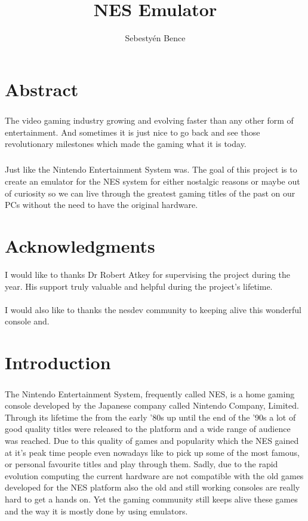 \documentclass[]{report}
\title{NES Emulator}
\author{Sebestyén Bence}
\begin{document}
	
\chapter*{Abstract}
\paragraph{ }
The video gaming industry growing and evolving faster than any other form of entertainment. And sometimes it is just nice to go back and see those revolutionary milestones which made the gaming what it is today. 
\paragraph{ }
Just like the Nintendo Entertainment System was. The goal of this project is to create an emulator for the NES system for either nostalgic reasons or maybe out of curiosity so we can live through the greatest gaming titles of the past on our PCs without the need to have the original hardware.

\pagebreak

\chapter*{Acknowledgments}
I would like to thanks Dr Robert Atkey for supervising the project during the year. His support truly valuable and helpful during the project's lifetime.
\\
\\
I would also like to thanks the nesdev community to keeping alive this wonderful console and.
\pagebreak


\tableofcontents

\clearpage

\chapter{Introduction}

\paragraph{}
The Nintendo Entertainment System, frequently called NES, is a home gaming console developed by the Japanese company called Nintendo Company, Limited.  Through its lifetime the from the early '80s up until the end of the '90s a lot of good quality titles were released to the platform and a wide range of audience was reached. Due to this quality of games and popularity which the NES gained at it's peak time people even nowadays like to pick up some of the most famous, or personal favourite titles and play through them. Sadly, due to the rapid evolution computing the current hardware are not compatible with the old games developed for the NES platform also the old and still working consoles are really hard to get a hands on. Yet the gaming community still keeps alive these games and the way it is mostly done by using emulators.
\end{document}
